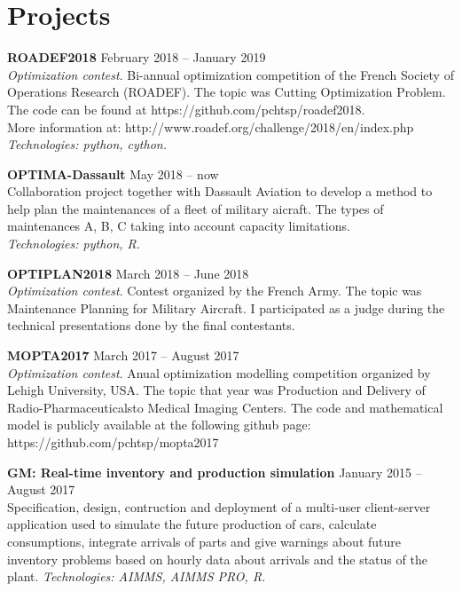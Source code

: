 \section{Projects} 
        
\textbf{ROADEF2018} 
	\hfill February 2018 -- January 2019\\
		\textsl{Optimization contest}. Bi-annual optimization competition of the French Society of Operations Research (ROADEF). The topic was Cutting Optimization Problem. The code can be found at https://github.com/pchtsp/roadef2018.\\
		More information at: http://www.roadef.org/challenge/2018/en/index.php \\
		\textsl{Technologies: python, cython.}

\textbf{OPTIMA-Dassault} 
	\hfill May 2018 -- now\\
		Collaboration project together with Dassault Aviation to develop a method to help plan the maintenances of a fleet of military aicraft. The types of maintenances A, B, C taking into account capacity limitations. \\
		\textsl{Technologies: python, R.}

\textbf{OPTIPLAN2018} 
	\hfill March 2018 -- June 2018\\
		\textsl{Optimization contest}. Contest organized by the French Army. The topic was Maintenance Planning for Military Aircraft. I participated as a judge during the technical presentations done by the final contestants.

\textbf{MOPTA2017} 	
	\hfill March 2017 -- August 2017\\
		\textsl{Optimization contest}. Anual optimization modelling competition organized by Lehigh University, USA. The topic that year was Production and Delivery of Radio-Pharmaceuticalsto Medical Imaging Centers. The code and mathematical model is publicly available at the following github page:\\
		https://github.com/pchtsp/mopta2017

\textbf{GM: Real-time inventory and production simulation} 
	\hfill January 2015 -- August 2017\\
	Specification, design, contruction and deployment of a multi-user client-server application used to simulate the future production of cars, calculate consumptions, integrate arrivals of parts and give warnings about future inventory problems based on hourly data about arrivals and the status of the plant.
	\textsl{Technologies: AIMMS, AIMMS PRO, R.}

